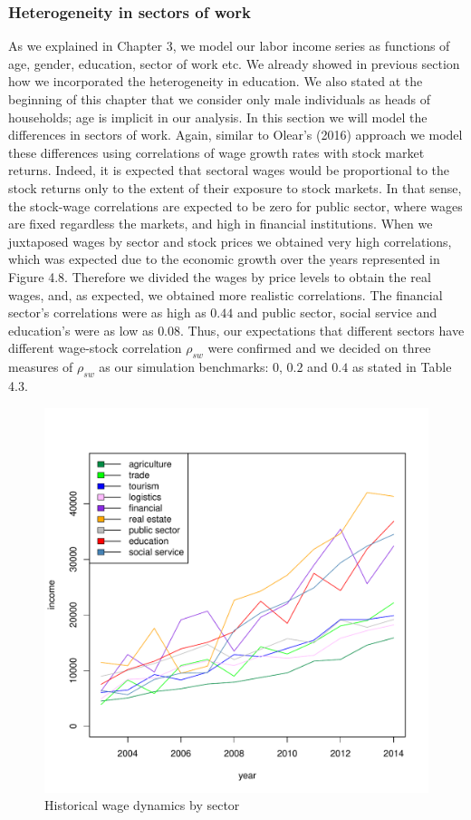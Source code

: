 \subsubsection{Heterogeneity in sectors of work}

As we explained in Chapter 3, we model our labor income series as functions of age, gender, education, sector of work etc. We already showed in previous section how we incorporated the heterogeneity in education. We also stated at the beginning of this chapter that we consider only male individuals as heads of households; age is implicit in our analysis. In this section we will model the differences in sectors of work. Again, similar to Olear's (2016) approach we model these differences using correlations of wage growth rates with stock market returns. Indeed, it is expected that sectoral wages would be proportional to the stock returns only to the extent of their exposure to stock markets. In that sense, the stock-wage correlations are expected to be zero for public sector, where wages are fixed regardless the markets, and high in financial institutions. When we juxtaposed wages by sector and stock prices we obtained very high correlations, which was expected due to the economic growth over the years represented in Figure 4.8. Therefore we divided the wages by price levels to obtain the real wages, and, as expected, we obtained more realistic correlations. The financial sector's correlations were as high as $0.44$  and public sector, social service and education's were as low as $0.08$. Thus, our expectations that different sectors have different wage-stock correlation $\rho_{sw}$ were confirmed and we decided on three measures of $\rho_{sw}$ as our simulation benchmarks: $0$, $0.2$ and $0.4$ as stated in Table 4.3.

\begin{figure}[h]
	\centering
	\includegraphics[scale=0.6]{figs/wage2sec.pdf}
	\caption{Historical wage dynamics by sector}
\end{figure}

